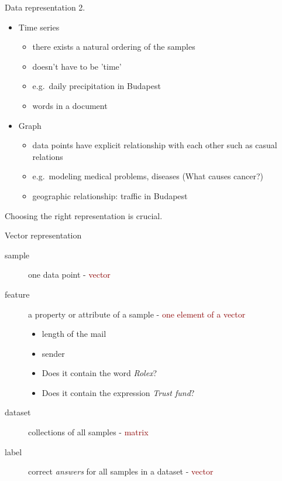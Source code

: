 \documentclass[bigger]{beamer}
\begin{document}
\begin{frame}{Data representation 2.}
    \begin{itemize}
        \item Time series
            \begin{itemize}
                \item there exists a natural ordering of the samples
                \item doesn't have to be 'time'
                \item e.g.~daily precipitation in Budapest
                \item words in a document
            \end{itemize}
        \item Graph
            \begin{itemize}
                \item data points have explicit relationship with each other such as casual relations
                \item e.g.~modeling medical problems, diseases (What causes cancer?)
                \item geographic relationship: traffic in Budapest
            \end{itemize}
    \end{itemize}
    Choosing the right representation is crucial.
\end{frame}

\begin{frame}{Vector representation}
    \begin{description}
        \item[sample] one data point - \textcolor{darkred}{vector}
        \item[feature] a property or attribute of a sample - \textcolor{darkred}{one element of a vector}
		 \begin{itemize}
			\item length of the mail
			\item sender
			\item Does it contain the word \emph{Rolex}?
			\item Does it contain the expression \emph{Trust fund}?
		\end{itemize}
        \item[dataset] collections of all samples - \textcolor{darkred}{matrix}
        \item[label] correct \emph{answers} for all samples in a dataset - \textcolor{darkred}{vector}
    \end{description}
\end{frame}
\end{document}
